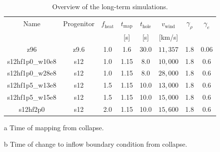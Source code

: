 \begin{table}[ht!]
\begin{threeparttable}[t]
    \caption{Overview of the long-term simulations.}
    \label{tab:sim_params}
    \centering
    \begin{tabular*}{\columnwidth}{@{\extracolsep{\stretch{1}}}*{8}{c}@{}}
    \hline
    \hline
    Name            & Progenitor & \(f_\mathrm{heat}\) & \(t_\mathrm{map}\)\tnote{a} & \(t_\mathrm{hole}\)\tnote{b} & \(v_\mathrm{wind}\) & \(\gamma_{\rho}\) & \(\gamma_{e}\) \\ 
                    &            &                     & [s]                         & [s]                          & [km/s]              &                   &                \\ \hline
    z96             & z9.6       & 1.0                 & 1.6                         & 30.0                         & \(11{,}357\)          & 1.8               & 0.06           \\
    s12hf1p0\_w10e8 & s12        & 1.0                 & 1.15                        & 8.0                          & \(10{,}000\)          & 1.8               & 0.6            \\
    s12hf1p0\_w28e8 & s12        & 1.0                 & 1.15                        & 8.0                          & \(28{,}000\)          & 1.8               & 0.6            \\
    s12hf1p5\_w13e8 & s12        & 1.5                 & 1.15                        & 10.0                         & \(13{,}000\)          & 1.8               & 0.6            \\
    s12hf1p5\_w15e8 & s12        & 1.5                 & 1.15                        & 10.0                         & \(15{,}000\)          & 1.8               & 0.6            \\
    s12hf2p0        & s12        & 2.0                 & 1.15                        & 10.0                         & \(15{,}600\)          & 1.8               & 0.6            \\
    \hline
    \end{tabular*}
    \begin{tablenotes}
        \item[a] Time of mapping from collapse.
        \item[b] Time of change to inflow boundary condition from collapse.
    \end{tablenotes}
\end{threeparttable}
\end{table}

